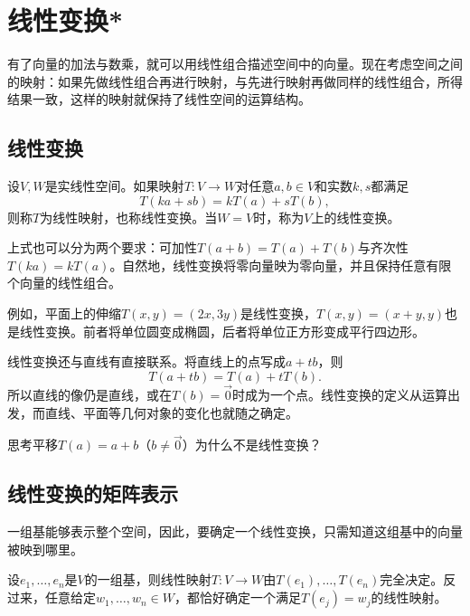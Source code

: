 \section{线性变换*}
有了向量的加法与数乘，就可以用线性组合描述空间中的向量。现在考虑空间之间的映射：如果先做线性组合再进行映射，与先进行映射再做同样的线性组合，所得结果一致，这样的映射就保持了线性空间的运算结构。

\subsection{线性变换}
\begin{definition}\label{def:linmap}
设\(V , W\)是实线性空间。如果映射\(T : V \longrightarrow W\)对任意\(a , b \in V\)和实数\(k , s\)都满足
\begin{equation}
    T \left( k a + s b \right) = k T \left( a \right) + s T \left( b \right) ,
\end{equation}
则称\(T\)为线性映射，也称线性变换。当\(W = V\)时，称为\(V\)上的线性变换。
\end{definition}

上式也可以分为两个要求：可加性\(T \left( a + b \right) = T \left( a \right) + T \left( b \right)\)与齐次性\(T \left( k a \right) = k T \left( a \right)\)。自然地，线性变换将零向量映为零向量，并且保持任意有限个向量的线性组合。

例如，平面上的伸缩\(T \left( x , y \right) = \left( 2 x , 3 y \right)\)是线性变换，\(T \left( x , y \right) = \left( x + y , y \right)\)也是线性变换。前者将单位圆变成椭圆，后者将单位正方形变成平行四边形。

线性变换还与直线有直接联系。将直线上的点写成\(a + t b\)，则
\begin{equation}
    T \left( a + t b \right) = T \left( a \right) + t T \left( b \right) .
\end{equation}
所以直线的像仍是直线，或在\(T \left( b \right) = \vec{0}\)时成为一个点。线性变换的定义从运算出发，而直线、平面等几何对象的变化也就随之确定。

{\kaiti{}思考\quad 平移\(T \left( a \right) = a + b\)（\(b \ne \vec{0}\)）为什么不是线性变换？}

\subsection{线性变换的矩阵表示}
一组基能够表示整个空间，因此，要确定一个线性变换，只需知道这组基中的向量被映到哪里。

\begin{theorem}\label{thm:linmap-basis}
设\(e_{1} , \ldots , e_{n}\)是\(V\)的一组基，则线性映射\(T : V \longrightarrow W\)由\(T \left( e_{1} \right) , \ldots , T \left( e_{n} \right)\)完全决定。反过来，任意给定\(w_{1} , \ldots , w_{n} \in W\)，都恰好确定一个满足\(T \left( e_{j} \right) = w_{j}\)的线性映射。
\end{theorem}

